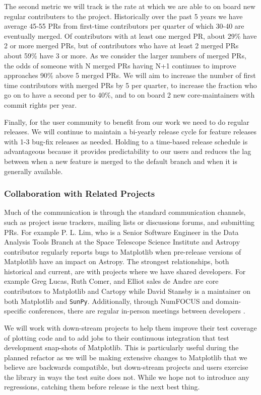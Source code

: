 \documentclass[12pt]{article}
\numberwithin{page}{section}
\begin{document}
The second metric we will track is the rate at which we are able to on board
new regular contributers to the project.  Historically over the past 5 years we
have average 45-55 PRs from first-time contributors per quarter of which 30-40
are eventually merged.  Of contributors with at least one merged PR, about 29\%
have 2 or more merged PRs, but of contributors who have at least 2 merged PRs
about 59\% have 3 or more.  As we consider the larger numbers of merged PRs,
the odds of someone with N merged PRs having N+1 continues to improve
approaches 90\% above 5 merged PRs.  We will aim to increase the number of
first time contributors with merged PRs by 5 per quarter, to increase the
fraction who go on to have a second per to 40\%, and to on board 2 new
core-maintainers with commit rights per year.

Finally, for the user community to benefit from our work we need to do
regular releases.  We will continue to maintain a bi-yearly release
cycle for feature releases with 1-3 bug-fix releases as needed.
Holding to a time-based release schedule is advantageous because it
provides predictability to our users and reduces the lag between when a
new feature is merged to the default branch and when it is generally
available.


\subsubsection{Collaboration with Related Projects}


Much of the communication is through the standard communication channels, such
as project issue trackers, mailing lists or discussions forums, and submitting
PRs.  For example P. L. Lim, who is a Senior Software Engineer in the Data
Analysis Tools Branch at the Space Telescope Science Institute and Astropy
contributor regularly reports bugs to Matplotlib when pre-release versions of
Matplotlib have an impact on Astropy.  The strongest relationships, both
historical and current, are with projects where we have shared developers.  For
example Greg Lucas, Ruth Comer, and Elliot sales de Andre are core contributors
to Matplotlib and Cartopy while David Stansby is a maintainer on both
Matplotlib and \texttt{SunPy}.  Additionally, through NumFOCUS and
domain-specific conferences, there are regular in-person meetings between
developers .

We will work with down-stream projects to help them improve their test
coverage of plotting code and to add jobs to their continuous
integration that test development snap-shots of Matplotlib.  This is
particularly useful during the planned refactor as we will be making
extensive changes to Matplotlib that we believe are backwards
compatible, but down-stream projects and users exercise the library in
ways the test suite does not.  While we hope not to introduce any
regressions, catching them before release is the next best thing.
\end{document}
